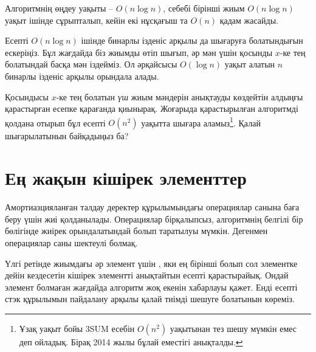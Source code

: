 \begin{center}
\end{center}

Алгоритмнің өңдеу уақыты -- $O(n \log n)$, себебі бірінші
жиым $O(n \log n)$ уақыт ішінде сұрыпталып, кейін екі нұсқағыш та 
$O(n)$ қадам жасайды.

Есепті $O(n \log n)$ ішінде бинарлы ізденіс арқылы да шығаруға болатындығын ескеріңіз.
Бұл жағдайда біз жиымды өтіп шығып, әр мән үшін қосынды $x$-ке тең болатындай басқа мән іздейміз.
Ол әрқайсысы $O(\log n)$ уақыт алатын $n$ бинарлы ізденіс арқылы орындала алады.

Қосындысы $x$-ке тең болатын \emph{үш} жиым мәндерін анықтауды 
көздейтін  алдыңғы қарастырған есепке қарағанда қиынырақ.
Жоғарыда қарастырылған алгоритмді қолдана отырып бұл есепті
$O(n^2)$ уақытта шығара аламыз\footnote{Ұзақ уақыт бойы
3SUM есебін $O(n^2)$ уақытынан тез шешу мүмкін емес деп ойладық.
Бірақ 2014 жылы бұлай еместігі\cite{gro14} анықталды.}.
Қалай шығарылатынын байқадыңыз ба?

\section{Ең жақын кішірек элементтер} %


Амортиазцияланған талдау деректер құрылымындағы
операциялар санына баға беру үшін жиі қолданылады.
Операциялар бірқалыпсыз, алгоритмнің белгілі бір бөлігінде
жиірек орындалатындай болып таратылуы мүмкін.
Дегенмен операциялар саны шектеулі болмақ.

Үлгі ретінде жиымдағы әр элемент үшін ,
яки ең бірінші болып сол элементке дейін кездесетін кішірек элементті анықтайтын
есепті қарастырайық.
Ондай элемент болмаған жағдайда алгоритм
жоқ екенін хабарлауы қажет. 
Енді есепті стэк құрылымын пайдалану арқылы қалай тиімді шешуге болатынын көреміз.

